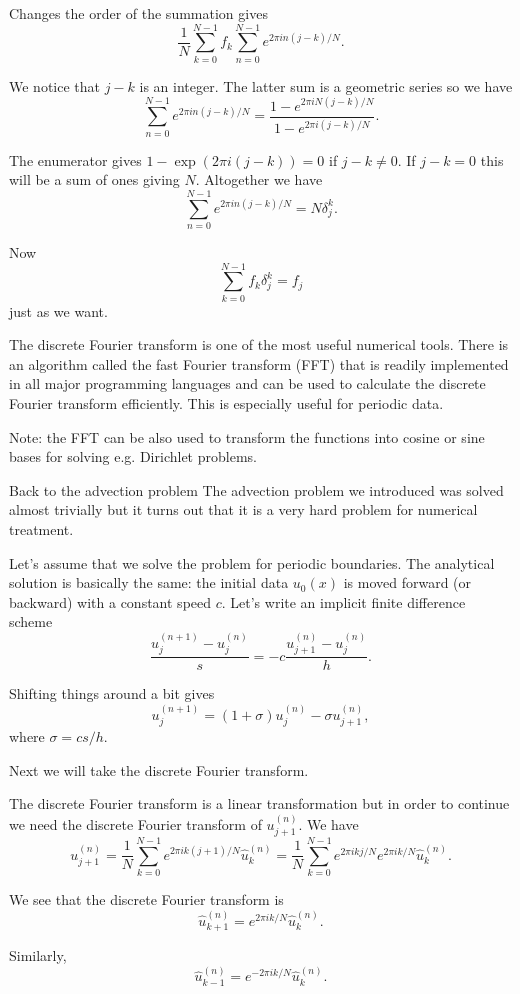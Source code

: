 \begin{frame}
	Changes the order of the summation gives
	\[ \frac{1}{N} \sum_{k=0}^{N-1} f_{k} \sum_{n=0}^{N-1} e^{2\pi i n (j-k)/N}.  \]
	
	\pause
	We notice that $ j-k $ is an integer. The latter sum is a geometric series so we have 
	\[ \sum_{n=0}^{N-1} e^{2\pi i n (j-k)/N} = \frac{1 -e^{2\pi i N (j-k)/N} }{1 - e^{2\pi i (j-k)/N}}. \]
	
	\pause
	The enumerator gives $ 1 - \exp(2\pi i(j-k)) = 0 $ if $ j-k \neq 0 $. If $ j-k=0 $ this will be a sum of ones giving $ N $. Altogether we have
	\[ \sum_{n=0}^{N-1} e^{2\pi i n (j-k)/N} = N \delta_{j}^{k}. \]
	
	\pause
	Now 
	\[ \sum_{k=0}^{N-1} f_{k} \delta_{j}^{k} = f_{j} \]
	just as we want.
\end{frame}

\begin{frame}
	The discrete Fourier transform is one of the most useful numerical tools. There is an algorithm called the \alert{fast Fourier transform} (FFT) that is readily implemented in all major programming languages and can be used to calculate the discrete Fourier transform efficiently. This is especially useful for periodic data. 
	
	\pause
	Note: the FFT can be also used to transform the functions into cosine or sine bases for solving e.g. Dirichlet problems. 
\end{frame}

\begin{frame}{Back to the advection problem}
	The advection problem we introduced was solved almost trivially but it turns out that it is a very hard problem for numerical treatment.
	
	\pause
	Let's assume that we solve the problem for periodic boundaries. The analytical solution is basically the same: the initial data $ u_{0}(x) $ is moved forward (or backward) with a constant speed $ c $. Let's write an implicit finite difference scheme 
	\[ \frac{u_{j}^{(n+1)} - u_{j}^{(n)}}{s} = -c \frac{u_{j + 1}^{(n)} - u_{j}^{(n)}}{h}.   \]
	
	\pause
	Shifting things around a bit gives
	\[ u_{j}^{(n+1)} = (1 + \sigma ) u_{j}^{(n)} - \sigma u_{j + 1}^{(n)}, \]
	where $ \sigma = cs/h $.
	
	\pause
	Next we will take the discrete Fourier transform.
\end{frame}

\begin{frame}
	The discrete Fourier transform is a linear transformation but in order to continue we need the discrete Fourier transform of $ u_{j+1}^{(n)} $. We have
	\[ u_{j+1}^{(n)} = \frac{1}{N} \sum_{k=0}^{N-1} e^{2\pi i k(j+1)/N} \hat{u}_{k}^{(n)}  
	= \frac{1}{N} \sum_{k=0}^{N-1} e^{2\pi i kj/N} e^{2\pi i k/N} \hat{u}_{k}^{(n)}. \]
	
	\pause
	We see that the discrete Fourier transform is 
	\[  \hat{u}_{k+1}^{(n)} = e^{2\pi i k/N} \hat{u}_{k}^{(n)}.  \]
	
	\pause
	Similarly,
	\[  \hat{u}_{k-1}^{(n)} = e^{-2\pi i k/N} \hat{u}_{k}^{(n)}.  \]
\end{frame}


